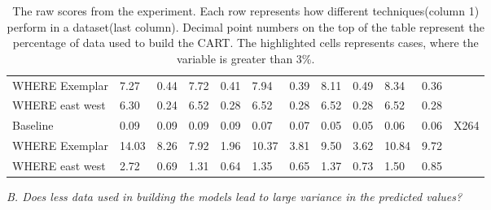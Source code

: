 \documentclass{sig-alternative}
\begin{document}
\begin{table}
\begin{tabular}{|l|l|l|l|l|l|l|l|l|l|ll|}
\multicolumn{1}{|l|}{WHERE Exemplar}  & 7.27                & 0.44             & 7.72                & 0.41              & 7.94                & 0.39             & 8.11                & 0.49             & 8.34                & \multicolumn{1}{l|}{0.36}  &                                           \\
\multicolumn{1}{|l|}{WHERE east west} & 6.30                 & 0.24             & 6.52                & 0.28             & 6.52                & 0.28             & 6.52                & 0.28           & 6.52                & \multicolumn{1}{l|}{0.28}  &                                           \\ \hline
\multicolumn{1}{|l|}{Baseline}        & 0.09               & 0.09             & 0.09                & 0.09             & 0.07                & 0.07             & 0.05                & 0.05             & 0.06                & \multicolumn{1}{l|}{0.06}  & \multirow{3}{*}{X264} \\
\multicolumn{1}{|l|}{WHERE Exemplar}  & 14.03               & \cellcolor[HTML]{9B9B9B}8.26              & 7.92                 & 1.96             & 10.37               & \cellcolor[HTML]{9B9B9B}3.81             & 9.50                & \cellcolor[HTML]{9B9B9B}3.62             & 10.84               & \multicolumn{1}{l|}{\cellcolor[HTML]{9B9B9B}9.72}  & \multicolumn{1}{c|}{}                      \\
\multicolumn{1}{|l|}{WHERE east west} & 2.72                & 0.69             & 1.31                & 0.64              & 1.35                & 0.65             & 1.37                & 0.73             & 1.50                & \multicolumn{1}{l|}{0.85}  & \multicolumn{1}{c|}{}           \\\hline           

\end{tabular}

\caption{The raw scores from the experiment. Each row represents how different techniques(column 1) perform in a dataset(last column). Decimal point numbers on the top of the table represent the percentage of data used to build the CART. The highlighted cells represents cases, where the variable is greater than 3\%.}
\label{variance_table}
\end{table}

\textit{B. Does less data used in building the models lead to large
variance in the predicted values?}\\
\end{document}
